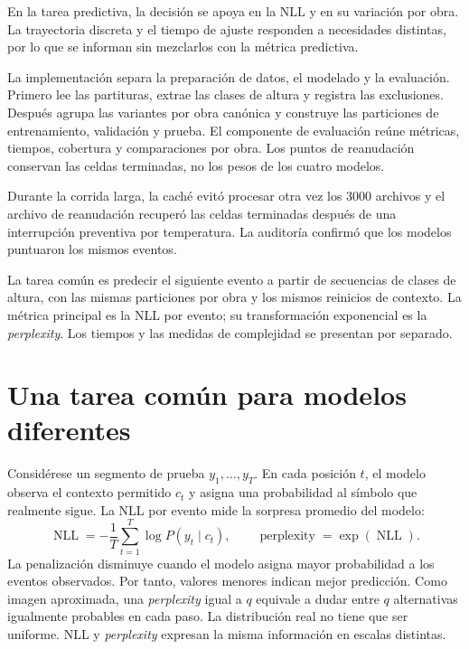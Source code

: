 

En la tarea predictiva, la decisión se apoya en la NLL y en su variación por obra. La trayectoria discreta y el tiempo de ajuste responden a necesidades distintas, por lo que se informan sin mezclarlos con la métrica predictiva.

La implementación separa la preparación de datos, el modelado y la evaluación. Primero lee las partituras, extrae las clases de altura y registra las exclusiones. Después agrupa las variantes por obra canónica y construye las particiones de entrenamiento, validación y prueba. El componente de evaluación reúne métricas, tiempos, cobertura y comparaciones por obra. Los puntos de reanudación conservan las celdas terminadas, no los pesos de los cuatro modelos.

Durante la corrida larga, la caché evitó procesar otra vez los $3000$ archivos y el archivo de reanudación recuperó las celdas terminadas después de una interrupción preventiva por temperatura. La auditoría confirmó que los modelos puntuaron los mismos eventos.

La tarea común es predecir el siguiente evento a partir de secuencias de clases de altura, con las mismas particiones por obra y los mismos reinicios de contexto. La métrica principal es la NLL por evento; su transformación exponencial es la \emph{perplexity}. Los tiempos y las medidas de complejidad se presentan por separado.

\section{Una tarea común para modelos diferentes}

Considérese un segmento de prueba $y_1,\ldots,y_T$. En cada posición $t$, el modelo observa el contexto permitido $c_t$ y asigna una probabilidad al símbolo que realmente sigue. La NLL por evento mide la sorpresa promedio del modelo:
\[
\operatorname{NLL}
=
-\frac{1}{T}\sum_{t=1}^{T}\log P(y_t\mid c_t),
\qquad
\operatorname{perplexity}=\exp(\operatorname{NLL}).
\]
La penalización disminuye cuando el modelo asigna mayor probabilidad a los eventos observados. Por tanto, valores menores indican mejor predicción. Como imagen aproximada, una \emph{perplexity} igual a $q$ equivale a dudar entre $q$ alternativas igualmente probables en cada paso. La distribución real no tiene que ser uniforme. NLL y \emph{perplexity} expresan la misma información en escalas distintas.

